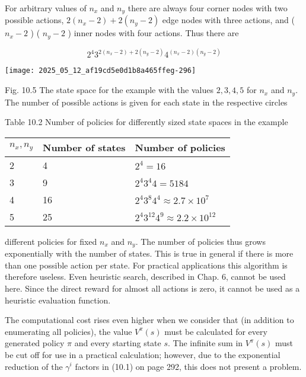 \documentclass[10pt]{article}
\begin{document}
For arbitrary values of $n_{x}$ and $n_{y}$ there are always four corner nodes with two possible actions, $2\left(n_{x}-2\right)+2\left(n_{y}-2\right)$ edge nodes with three actions, and ( $n_{x}-2$ ) ( $n_{y}-2$ ) inner nodes with four actions. Thus there are

$$
2^{4} 3^{2\left(n_{x}-2\right)+2\left(n_{y}-2\right)} 4^{\left(n_{x}-2\right)\left(n_{y}-2\right)}
$$

\begin{center}
\texttt{[image: 2025\_05\_12\_af19cd5e0d1b8a465ffeg-296]}
\end{center}

Fig. 10.5 The state space for the example with the values $2,3,4,5$ for $n_{x}$ and $n_{y}$. The number of possible actions is given for each state in the respective circles

Table 10.2 Number of policies for differently sized state spaces in the example

\begin{center}
\begin{tabular}{lll}
\hline
$n_{x}, n_{y}$ & Number of states & Number of policies \\
\hline
2 & 4 & $2^{4}=16$ \\
\hline
3 & 9 & $2^{4} 3^{4} 4=5184$ \\
\hline
4 & 16 & $2^{4} 3^{8} 4^{4} \approx 2.7 \times 10^{7}$ \\
\hline
5 & 25 & $2^{4} 3^{12} 4^{9} \approx 2.2 \times 10^{12}$ \\
\hline
\end{tabular}
\end{center}

different policies for fixed $n_{x}$ and $n_{y}$. The number of policies thus grows exponentially with the number of states. This is true in general if there is more than one possible action per state. For practical applications this algorithm is therefore useless. Even heuristic search, described in Chap. 6, cannot be used here. Since the direct reward for almost all actions is zero, it cannot be used as a heuristic evaluation function.

The computational cost rises even higher when we consider that (in addition to enumerating all policies), the value $V^{\pi}(s)$ must be calculated for every generated policy $\pi$ and every starting state $s$. The infinite sum in $V^{\pi}(s)$ must be cut off for use in a practical calculation; however, due to the exponential reduction of the $\gamma^{i}$ factors in (10.1) on page 292, this does not present a problem.
\end{document}
